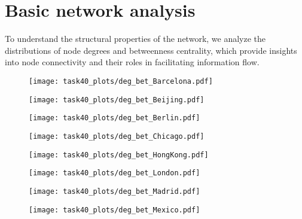 
\newpage
\section{Basic network analysis}
To understand the structural properties of the network, we analyze the distributions of node degrees and betweenness centrality, which provide insights into node connectivity and their roles in facilitating information flow.
\begin{figure}[hbtp]
    \centering
    \begin{minipage}{0.48\linewidth}
        \centering
        \texttt{[image: task40\_plots/deg\_bet\_Barcelona.pdf]}
        \end{minipage}%
    \hfill
    \begin{minipage}{0.48\linewidth}
        \centering
        \texttt{[image: task40\_plots/deg\_bet\_Beijing.pdf]}
    \end{minipage}
\end{figure}

\begin{figure}[hbtp]
    \centering
    \begin{minipage}{0.48\linewidth}
        \centering
        \texttt{[image: task40\_plots/deg\_bet\_Berlin.pdf]}
        \end{minipage}%
    \hfill
    \begin{minipage}{0.48\linewidth}
        \centering
        \texttt{[image: task40\_plots/deg\_bet\_Chicago.pdf]}
    \end{minipage}
\end{figure}

\begin{figure}[hbtp]
    \centering
    \begin{minipage}{0.48\linewidth}
        \centering
        \texttt{[image: task40\_plots/deg\_bet\_HongKong.pdf]}
        \end{minipage}%
    \hfill
    \begin{minipage}{0.48\linewidth}
        \centering
        \texttt{[image: task40\_plots/deg\_bet\_London.pdf]}
    \end{minipage}
\end{figure}

\begin{figure}[h!]
    \centering
    \begin{minipage}{0.48\linewidth}
        \centering
        \texttt{[image: task40\_plots/deg\_bet\_Madrid.pdf]}
        \end{minipage}%
    \hfill
    \begin{minipage}{0.48\linewidth}
        \centering
        \texttt{[image: task40\_plots/deg\_bet\_Mexico.pdf]}
    \end{minipage}
\end{figure}

